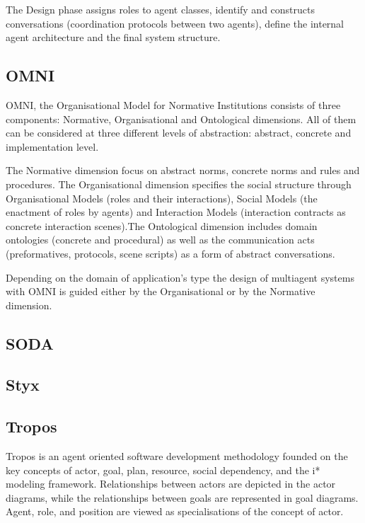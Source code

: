\documentclass{article}
\begin{document}
The Design phase assigns roles to agent classes, identify and constructs conversations (coordination protocols between two agents), define the internal agent architecture and the final system structure. 

\subsection{OMNI}

OMNI, the Organisational Model for Normative Institutions \cite{journals/aamas/Vazquez-SalcedaDD05} consists of three components: Normative, Organisational and Ontological dimensions. All of them can be considered at three different levels of abstraction: abstract, concrete and implementation level.

The Normative dimension focus on abstract norms, concrete norms and rules and procedures. The Organisational dimension specifies the social structure through Organisational Models (roles and their interactions), Social Models (the enactment of roles by agents) and Interaction Models (interaction contracts as concrete interaction scenes).The Ontological dimension includes domain ontologies (concrete and procedural) as well as the communication acts (preformatives, protocols, scene scripts) as a form of abstract conversations.

Depending on the domain of application's type the design of multiagent systems with OMNI is guided either by the Organisational or by the Normative dimension.

\subsection{SODA}

\cite{conf/aose/Omicini00}

\subsection{Styx}

\cite{bush2001styx}

\subsection{Tropos}

Tropos \cite{journals/informaticaSI/SusiPMG05} is an agent oriented software development methodology founded on the key concepts of actor, goal, plan, resource, social dependency, and the i* modeling framework. Relationships between actors are depicted in the actor diagrams, while the relationships between goals are represented in goal diagrams. Agent, role, and position are viewed as specialisations of the concept of actor.
\end{document}

